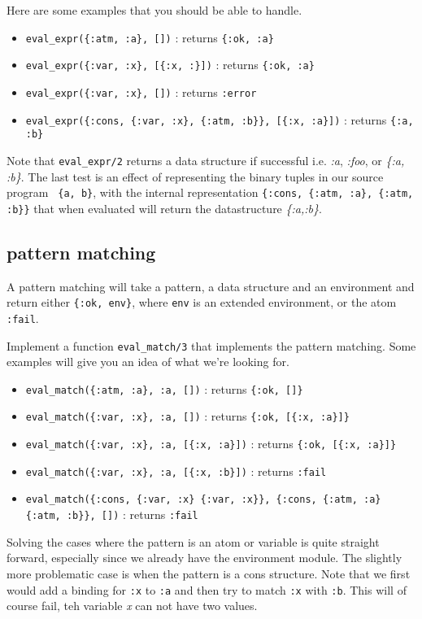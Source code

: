 \documentclass[a4paper,11pt]{article}
\begin{document}
Here are some examples that you should be able to handle.

\begin{itemize}
\item {\tt eval\_expr(\{:atm, :a\}, [])} : returns {\tt \{:ok, :a\}}
 \item {\tt eval\_expr(\{:var, :x\},  [\{:x, :\}])} : returns {\tt \{:ok, :a\}}
 \item {\tt eval\_expr(\{:var, :x\},  [])} : returns {\tt :error}
 \item {\tt eval\_expr(\{:cons, \{:var, :x\}, \{:atm, :b\}\},  [\{:x, :a\}])} : returns {\tt \{:a, :b\}} 
\end{itemize}


Note that {\tt eval\_expr/2} returns a data structure if successful
i.e. {\em :a}, {\em :foo}, or {\em \{:a, :b\}}.  The last test is an
effect of representing the binary tuples in our source program {\tt
  \{a, b\}}, with the internal representation {\tt \{:cons, \{:atm,
  :a\}, \{:atm, :b\}\}} that when evaluated will return the
datastructure {\it \{:a,:b\}}.

\subsection{pattern matching}

A pattern matching will take a pattern, a data structure and an
environment and return either {\tt \{:ok, env\}}, where {\tt env} is an
extended environment, or the atom {\tt :fail}. 

Implement a function {\tt eval\_match/3} that implements
the pattern matching. Some examples will give you an idea of what
we're looking for.

\begin{itemize}
 \item {\tt eval\_match(\{:atm, :a\}, :a, [])} : returns {\tt \{:ok, []\}}
 \item {\tt eval\_match(\{:var, :x\}, :a, [])} : returns {\tt \{:ok, [\{:x, :a\}]\}}
 \item {\tt eval\_match(\{:var, :x\}, :a, [\{:x, :a\}])} : returns {\tt \{:ok, [\{:x, :a\}]\}}
 \item {\tt eval\_match(\{:var, :x\}, :a, [\{:x, :b\}])} : returns {\tt :fail}
 \item {\tt eval\_match(\{:cons, \{:var, :x\} \{:var, :x\}\}, \{:cons, \{:atm, :a\} \{:atm, :b\}\}, [])} : returns {\tt :fail}
\end{itemize}

Solving the cases where the pattern is an atom or variable is quite
straight forward, especially since we already have the environment
module. The slightly more problematic case is when the pattern is a
cons structure. Note that we first would add a binding for {\tt :x} to
{\tt :a} and then try to match {\tt :x} with {\tt :b}. This will of
course fail, teh variable {\em x} can not have two values.
\end{document}
